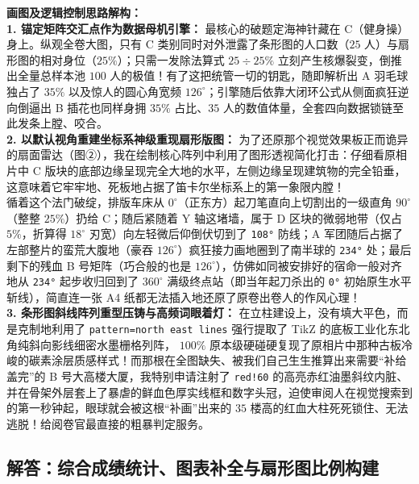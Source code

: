 \vspace{0.4cm}
{\small\color{blue!70!black}
\textbf{画图及逻辑控制思路解构：}\\
\textbf{1. 锚定矩阵交汇点作为数据母机引擎：} 最核心的破题定海神针藏在 C（健身操）身上。纵观全卷大图，只有 C 类别同时对外泄露了条形图的人口数（$25$ 人）与扇形图的相对身位（$25\%$）；只需一发除法算式 $25 \div 25\%$ 立刻产生核爆裂变，倒推出全量总样本池 $100$ 人的极值！有了这把统管一切的钥匙，随即解析出 A 羽毛球独占了 $35\%$ 以及惊人的圆心角宽频 $126^\circ$；引擎随后依靠大闭环公式从侧面疯狂逆向倒逼出 B 插花也同样身拥 $35\%$ 占比、$35$ 人的数值体量，全套四向数据锁链至此发条上膛、咬合。\\
\textbf{2. 以默认视角重建坐标系神级重现扇形版图：} 为了还原那个视觉效果板正而诡异的扇面雷达（图②），我在绘制核心阵列中利用了图形透视简化打击：仔细看原相片中 C 版块的底部边缘呈现完全大地的水平，左侧边缘呈现建筑物的完全铅垂，这意味着它牢牢地、死板地占据了笛卡尔坐标系上的第一象限内膛！\\
循着这个法门破绽，排版车床从 $0^\circ$（正东方）起刀笔直向上切割出的一级直角 $90^\circ$（整整 $25\%$）扔给 C；随后紧随着 Y 轴这堵墙，属于 D 区块的微弱地带（仅占 $5\%$，折算得 $18^\circ$ 刃宽）向左轻微后仰倒伏切到了 \texttt{108°} 防线；A 军团随后占据了左部整片的蛮荒大腹地（豪吞 $126^\circ$）疯狂接力画地圈到了南半球的 \texttt{234°} 处；最后剩下的残血 B 号矩阵（巧合般的也是 $126^\circ$），仿佛如同被安排好的宿命一般对齐地从 \texttt{234°} 起步收归回到了 $360^\circ$ 满级终点站（即当年起刀杀出的 \texttt{0°} 初始原生水平斩线），简直连一张 A4 纸都无法插入地还原了原卷出卷人的作风心理！\\
\textbf{3. 条形图斜线阵列重型压铸与高频词眼着灯：} 在立柱建设上，没有填大平色，而是克制地利用了 \texttt{pattern=north east lines} 强行提取了 TikZ 的底板工业化东北角纯斜向影线细密水墨栅格列阵， $100\%$ 原本级硬碰硬复现了原相片中那种古板冷峻的碳素涂层质感样式！而那根在全图缺失、被我们自己生生推算出来需要“补给盖完”的 B 号大高楼大厦，我特别申请注射了 \texttt{red!60} 的高亮赤红油墨斜纹内脏、并在骨架外层套上了暴虐的鲜血色厚实线框和数字头冠，迫使审阅人在视觉搜索到的第一秒钟起，眼球就会被这根“补画”出来的 $35$ 楼高的红血大柱死死锁住、无法逃脱！给阅卷官最直接的粗暴判定服务。
}

\newpage

\newpage

\subsection{解答：综合成绩统计、图表补全与扇形图比例构建}

